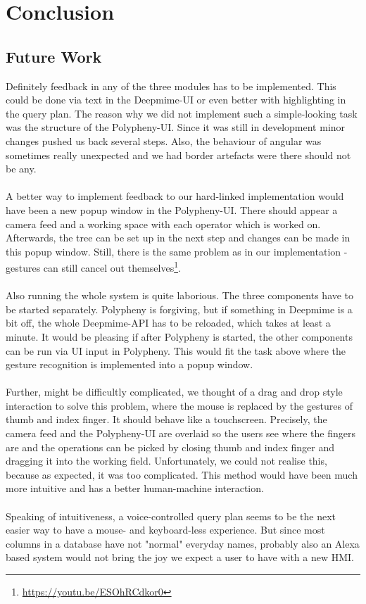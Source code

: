 \section{Conclusion}
\label{g1:sec:conclusion}
\subsection{Future Work}
Definitely feedback in any of the three modules has to be implemented. This could be done via text in the Deepmime-UI or even better with highlighting in the query plan. The reason why we did not implement such a simple-looking task was the structure of the Polypheny-UI. Since it was still in development minor changes pushed us back several steps. Also, the behaviour of angular was sometimes really unexpected and we had border artefacts were there should not be any.
\\
\\
A better way to implement feedback to our hard-linked implementation would have been a new popup window in the Polypheny-UI. There should appear a camera feed and a working space with each operator which is worked on. Afterwards, the tree can be set up in the next step and changes can be made in this popup window. Still, there is the same problem as in our implementation - gestures can still cancel out themselves\footnote{\url{https://youtu.be/ESOhRCdkor0}}. 
\\
\\
Also running the whole system is quite laborious. The three components have to be started separately. Polypheny is forgiving, but if something in Deepmime is a bit off, the whole Deepmime-API has to be reloaded, which takes at least a minute. It would be pleasing if after Polypheny is started, the other components can be run via UI input in Polypheny. This would fit the task above where the gesture recognition is implemented into a popup window.
\\
\\
Further, might be difficultly complicated, we thought of a drag and drop style interaction to solve this problem, where the mouse is replaced by the gestures of thumb and index finger. It should behave like a touchscreen. Precisely, the camera feed and the Polypheny-UI are overlaid so the users see where the fingers are and the operations can be picked by closing thumb and index finger and dragging it into the working field. Unfortunately, we could not realise this, because as expected, it was too complicated. This method would have been much more intuitive and has a better human-machine interaction.
\\
\\ 
Speaking of intuitiveness, a voice-controlled query plan seems to be the next easier way to have a mouse- and keyboard-less experience. But since most columns in a database have not "normal" everyday names, probably also an Alexa based system would not bring the joy we expect a user to have with a new HMI.

